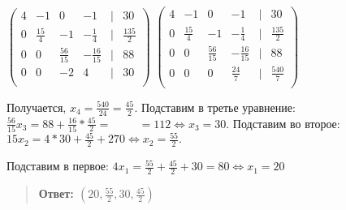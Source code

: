 \documentclass{article}
\begin{document}
\hspace{2cm}\Longleftrightarrow
$\begin{pmatrix}
    4 & -1 & 0 & -1 & | & 30 \\
    0 & \frac{15}{4} & -1 & -\frac{1}{4} & | &\frac{135}{2}  \\
    0 & 0 & \frac{56}{15} & -\frac{16}{15} & | & 88 \\
    0 & 0 & -2 & 4 & | & 30 \\
\end{pmatrix}$ \Longleftrightarrow
$\begin{pmatrix}
    4 & -1 & 0 & -1 & | & 30 \\
    0 & \frac{15}{4} & -1 & -\frac{1}{4} & | &\frac{135}{2}  \\
    0 & 0 & \frac{56}{15} & -\frac{16}{15} & | & 88 \\
    0 & 0 & 0 & \frac{24}{7} & | & \frac{540}{7}\\
\end{pmatrix}$

\hspace{1cm}Получается, $x_4 = \frac{540}{24} = \frac{45}{2}.$ 
Подставим в третье уравнение: $\frac{56}{15}x_3 = 88 + \frac{16}{15} * \frac{45}{2}= 

\hspace{1cm}= 112\Longleftrightarrow x_3 = 30.$ Подставим во второе: 
$15x_2 = 4 * 30 + \frac{45}{2} + 270 \Longleftrightarrow x_2 = \frac{55}{2}.$

\hspace{1cm}Подставим в первое: $4x_1 = \frac{55}{2} + \frac{45}{2} + 30 = 80 \Longleftrightarrow x_1 = 20$

\begin{quote}
\leftskip=0.1cm
    \textbf{Ответ: $(20, \frac{55}{2}, 30, \frac{45}{2})$}

\end{quote}
\end{document}
